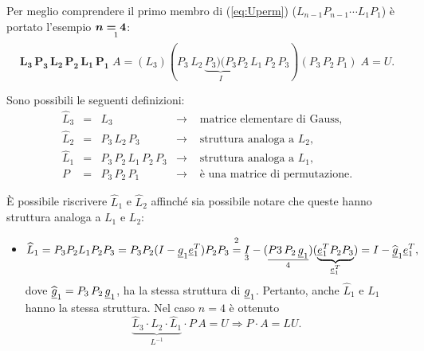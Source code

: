 \begin{example}
    Per meglio comprendere il primo membro di (\ref{eq:Uperm}) ($L_{n-1} P_{n-1} \cdots L_1 P_1$) è portato l'esempio $\boldsymbol n\underset{\footnotemark}{\boldsymbol {= 4}}$:
    \begin{equation*}
        \boldsymbol{L_3\,P_3\,L_2\,P_2\,L_1\,P_1}\; A=(L_3)(P_3\,L_2\,\underbrace{P_3)(P_3}_{I}P_2\,L_1\,P_2\,P_3)(P_3\, P_2\, P_1)\;A=U.
    \end{equation*}
    
    Sono possibili le seguenti definizioni:
    \begin{equation*}
        \begin{matrix}
            \widehat L_3 &=& L_3 &\rightarrow& \text{ matrice elementare di Gauss},\\
            \widehat L_2 &=& P_3\, L_2\, P_3 &\rightarrow& \text{ struttura analoga a }L_2,\\
            \widehat L_1 &=& P_3\,P_2\,L_1\,P_2\,P_3 &\rightarrow& \text{ struttura analoga a }L_1,\\
            P &=& P_3\,P_2\, P_1 &\rightarrow& \text{ è una matrice di permutazione}.
        \end{matrix}
    \end{equation*}
    
    È possibile riscrivere $\widehat L_1$ e $\widehat L_2$ affinché sia possibile notare che queste hanno struttura analoga a $L_1$ e $L_2$:
    
    \begin{itemize}
        \item \begin{equation*}
            \widehat L_1=P_3P_2L_1P_2P_3=P_3P_2(I-\uline g_1\uline e_1^T)P_2P_3\overset{\footnotemark}{=}\underset{\footnotemark}{I}-(\underset{\footnotemark}{\uline{P3\,P_2\,\uline g_1}})(\underbrace{\uline e_1^TP_2P_3}_{\uline e_1^T})=I-\widehat{\uline g}_1\uline e_1^T,
        \end{equation*}
        dove $\widehat{\uline g}_1=P_3\, P_2\, \uline g_1$, ha la stessa struttura di $\uline g_1$. Pertanto, anche $\widehat L_1$ e $L_1$ hanno la stessa struttura. Nel caso $n=4$ è ottenuto
        \begin{equation*}
                \underbrace{\widehat L_3\cdot \widehat L_2\cdot \widehat L_1}_{L^{-1}}\cdot P\, A = U\Rightarrow P\cdot A = LU.
        \end{equation*}


\end{itemize}
\end{example}
